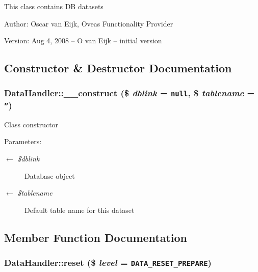 This class contains DB datasets \begin{Desc}
\item[Author:]Oscar van Eijk, Oveas Functionality Provider \end{Desc}
\begin{Desc}
\item[Version:]Aug 4, 2008 -- O van Eijk -- initial version \end{Desc}


\subsection{Constructor \& Destructor Documentation}
\hypertarget{classDataHandler_4eef16167dd9a5bc94bd0cb40ce1b180}{
\subsubsection{\setlength{\rightskip}{0pt plus 5cm}DataHandler::\_\-\_\-construct (\$ {\em dblink} = {\tt null}, \$ {\em tablename} = {\tt ''})}}
\label{classDataHandler_4eef16167dd9a5bc94bd0cb40ce1b180}


Class constructor \begin{Desc}
\item[Parameters:]
\begin{description}
\item[\mbox{$\leftarrow$} {\em \$dblink}]Database object \item[\mbox{$\leftarrow$} {\em \$tablename}]Default table name for this dataset \end{description}
\end{Desc}


\subsection{Member Function Documentation}
\hypertarget{classDataHandler_b89e1aaad9cd0a37f1c7f13c1d9c0d57}{
\subsubsection{\setlength{\rightskip}{0pt plus 5cm}DataHandler::reset (\$ {\em level} = {\tt {\bf DATA\_\-RESET\_\-PREPARE}})}}
\label{classDataHandler_b89e1aaad9cd0a37f1c7f13c1d9c0d57}


